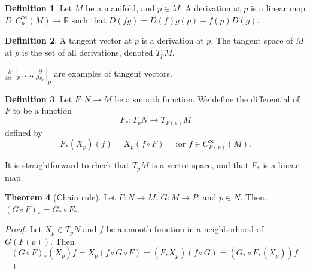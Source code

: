 \documentclass[]{article}
\theoremstyle{definition}
\newtheorem{theorem}{Theorem}[section] %
\theoremstyle{definition}
\newtheorem{definition}[theorem]{Definition} %
\begin{document}
\begin{definition}
    Let $M$ be a manifold, and $p\in M$. A derivation at $p$ is a linear map $D:C^\infty_p(M) \rightarrow \mathbb{R}$ such that $D(fg)=D(f)g(p)+f(p)D(g)$.
\end{definition}

\begin{definition}
    A tangent vector at $p$ is a derivation at $p$. The tangent space of $M$ at $p$ is the set of all derivations, denoted $T_pM$.
\end{definition}

$\frac{\partial}{\partial x_1}|_p, \dots, \frac{\partial}{\partial x_n}|_p$ are examples of tangent vectors. 

\begin{definition}
    Let $F: N \rightarrow M$ be a smooth function. We define the differential of $F$ to be a function\[F_*:T_pN \rightarrow T_{F(p)}M\] defined by \[F_*(X_p)(f)=X_p(f\circ F)\quad \text{ for } f\in C^\infty_{F(p)}(M).\]
\end{definition}

It is straightforward to check that $T_pM$ is a vector space, and that $F_*$ is a linear map.

\begin{theorem}[Chain rule]
    Let $F:N \rightarrow M$, $G:M \rightarrow P$, and $p\in N$. Then, $(G\circ F)_*=G_*\circ F_*$.
\end{theorem}
\begin{proof}
    Let $X_p\in T_pN$ and $f$ be a smooth function in a neighborhood of $G(F(p))$. Then \[(G\circ F)_*(X_p)f=X_p(f\circ G\circ F)=(F_*X_p)(f\circ G)=(G_*\circ F_*(X_p))f.\]
\end{proof}
\end{document}
